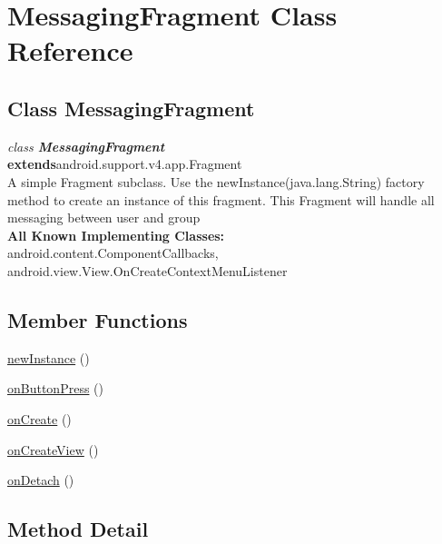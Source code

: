 \hypertarget{class_MessagingFragment.Android}{\section{MessagingFragment Class Reference}
\label{class_MessagingFragment.Android}
}

\subsection*{Class MessagingFragment}

\textit{class \textbf{MessagingFragment}}\\
\tab \textbf{extends}android.support.v4.app.Fragment\\


A simple Fragment subclass. Use the newInstance(java.lang.String) factory method to create an instance of this fragment. This Fragment will handle all messaging between user and group\\


\textbf{All Known Implementing Classes:}\\
\tab            android.content.ComponentCallbacks, android.view.View.OnCreateContextMenuListener\\



\subsection*{Member Functions}
\begin{DoxyCompactItemize}
\item 
\hyperlink{class_MessagingFragment.Android.newInstance}{newInstance} ()
\item 
\hyperlink{class_MessagingFragment.Android.onButtonPress}{onButtonPress} ()
\item 
\hyperlink{class_MessagingFragment.Android.onCreate}{onCreate} ()
\item 
\hyperlink{class_MessagingFragment.Android.onCreateView}{onCreateView} ()
\item 
\hyperlink{class_MessagingFragment.Android.onDetach}{onDetach} ()
\end{DoxyCompactItemize}




\subsection{Method Detail}

